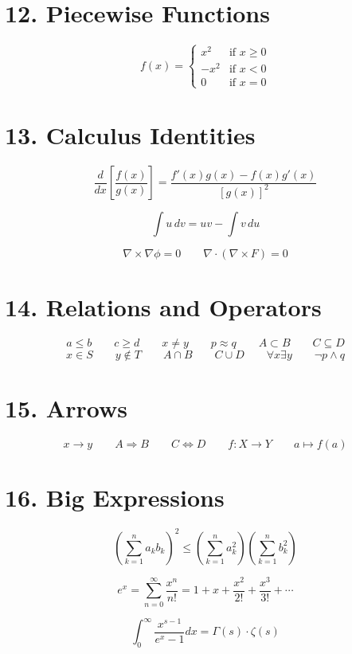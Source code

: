 \documentclass{article}
\begin{document}
\section*{12. Piecewise Functions}

\[
f(x) = \begin{cases}
x^2 & \text{if } x \geq 0 \\
-x^2 & \text{if } x < 0 \\
0 & \text{if } x = 0
\end{cases}
\]

\section*{13. Calculus Identities}

\[ \frac{d}{dx}\left[\frac{f(x)}{g(x)}\right] = \frac{f'(x)g(x) - f(x)g'(x)}{[g(x)]^2} \]

\[ \int u \, dv = uv - \int v \, du \]

\[ \nabla \times \nabla \phi = 0 \qquad \nabla \cdot (\nabla \times F) = 0 \]

\section*{14. Relations and Operators}

\[ a \leq b \qquad c \geq d \qquad x \neq y \qquad p \approx q \qquad A \subset B \qquad C \subseteq D \]
\[ x \in S \qquad y \notin T \qquad A \cap B \qquad C \cup D \qquad \forall x \exists y \qquad \neg p \wedge q \]

\section*{15. Arrows}

\[ x \to y \qquad A \Rightarrow B \qquad C \Leftrightarrow D \qquad f: X \to Y \qquad a \mapsto f(a) \]

\section*{16. Big Expressions}

\[
\left(\sum_{k=1}^{n} a_k b_k\right)^2 \leq \left(\sum_{k=1}^{n} a_k^2\right)\left(\sum_{k=1}^{n} b_k^2\right)
\]

\[
e^x = \sum_{n=0}^{\infty} \frac{x^n}{n!} = 1 + x + \frac{x^2}{2!} + \frac{x^3}{3!} + \cdots
\]

\[
\int_0^{\infty} \frac{x^{s-1}}{e^x - 1} dx = \Gamma(s) \cdot \zeta(s)
\]
\end{document}
